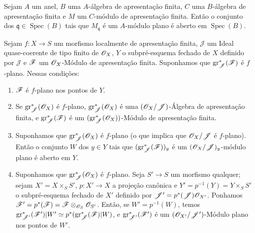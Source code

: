 \begin{corollary}[11.3.3]
\label{IV.11.3.3}
Sejam $A$ um anel, $B$ uma $A$-álgebra de apresentação finita,
$C$ uma $B$-álgebra de apresentação finita e $M$ um $C$-módulo
de apresentação finita. Então o conjunto dos
$\mathfrak q\in\operatorname{Spec}(B)$ tais que $M_{\mathfrak q}$
é um $A$-módulo plano é aberto em $\operatorname{Spec}(B)$.
\end{corollary}

\begin{proposition}[11.3.4]
\label{IV.11.3.4}
Sejam $f:X\to S$ um morfismo localmente de apresentação finita,
$\mathcal J$ um Ideal quase-coerente de tipo finito de $\mathscr{O}_X$,
$Y$ o subpré-esquema fechado de $X$ definido por $\mathcal J$
e $\mathscr{F}$ um $\mathscr{O}_X$-Módulo de apresentação finita.
Suponhamos que $\operatorname{gr}_{\mathscr J}^*(\mathscr{F})$
é $f$-plano. Nessas condições:
\begin{enumerate}[label=\emph{(\roman*)}]
\item $\mathscr{F}$ é $f$-plano nos pontos de $Y$.
\item Se $\operatorname{gr}_{\mathscr J}^*(\mathscr{O}_X)$ é $f$-plano,
$\operatorname{gr}_{\mathscr J}^*(\mathscr{O}_X)$ é uma
$(\mathscr{O}_X/\mathscr J)$-Álgebra de apresentação finita, e
$\operatorname{gr}_{\mathscr J}^*(\mathscr{F})$ é um
$(\operatorname{gr}_{\mathscr J}^*(\mathscr{O}_X))$-Módulo de
apresentação finita.
\item Suponhamos que $\operatorname{gr}_{\mathscr J}^*(\mathscr{O}_X)$
é $f$-plano (o que implica que $\mathscr{O}_X/\mathscr J$ é
$f$-plano). Então o conjunto $W$ dos $y\in Y$ tais que
$(\operatorname{gr}_{\mathscr J}^*(\mathscr{F}))_y$ é um
$(\mathscr{O}_X/\mathscr J)_y$-módulo plano é aberto em $Y$.
\item Suponhamos que $\operatorname{gr}_{\mathscr J}^*(\mathscr{O}_X)$
é $f$-plano. Seja $S'\to S$ um morfismo qualquer; sejam
$X'=X\times_SS'$, $p:X'\to X$ a projeção canônica e
$Y'=p^{-1}(Y)=Y\times_SS'$ o subpré-esquema fechado de $X'$
definido por $\mathscr J'=p^*(\mathscr J)\mathscr{O}_{X'}$.
Ponhamos $\mathscr{F}'=p^*(\mathscr{F})
=\mathscr{F}\otimes_{\mathscr{O}_S}\mathscr{O}_{S'}$. Então, se
$W'=p^{-1}(W)$, temos
$\operatorname{gr}_{\mathscr J'}^*(\mathscr{F}')|W'
\simeq p^*(\operatorname{gr}_{\mathscr J}^*(\mathscr{F})|W)$,
e $\operatorname{gr}_{\mathscr J'}^*(\mathscr{F}')$ é um
$(\mathscr{O}_{X'}/\mathscr J')$-Módulo plano nos pontos de $W'$.
\end{enumerate}
\end{proposition}

